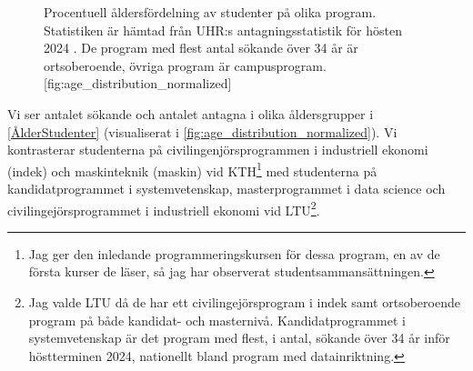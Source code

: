 \documentclass[a4paper,oneside,article,swedish]{memoir}
\begin{document}
\begin{figure}
  \begin{sidecaption}{%
    Procentuell åldersfördelning av studenter på olika program.
    Statistiken är hämtad från UHR:s antagningsstatistik för hösten 2024 
    \parencite{UHRstat}.
    De program med flest antal sökande över 34 år är ortsoberoende, övriga 
    program är campusprogram.
  }[fig:age_distribution_normalized]
  \centering
  \end{sidecaption}
\end{figure}

Vi ser antalet sökande och antalet antagna i olika åldersgrupper i 
\cref{ÅlderStudenter} (visualiserat i \cref{fig:age_distribution_normalized}).
Vi kontrasterar studenterna på civilingenjörsprogrammen i industriell ekonomi 
(indek) och maskinteknik (maskin) vid KTH\footnote{%
  Jag ger den inledande programmeringskursen för dessa program, en av de första 
  kurser de läser, så jag har observerat studentsammansättningen.
} med studenterna på kandidatprogrammet i systemvetenskap, masterprogrammet i 
data science och civilingejörsprogrammet i industriell ekonomi vid 
LTU\footnote{%
  Jag valde LTU då de har ett civilingejörsprogram i indek samt ortsoberoende 
  program på både kandidat- och masternivå.
  Kandidatprogrammet i systemvetenskap är det program med flest, i antal, 
  sökande över 34 år inför höstterminen 2024, nationellt bland program med 
  datainriktning.
}.
\end{document}
